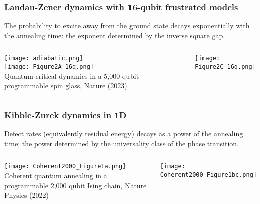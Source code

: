 \documentclass[aspectratio=169,final,11pt,forpublic]{beamer} %
\begin{document}
\begin{frame}\frametitle{\bf Landau-Zener dynamics with 16-qubit frustrated models}
  The probability to excite away from the ground state decays exponentially with the annealing time: the exponent determined by the inverse square gap. 
  \begin{columns}
    \begin{center}
    \texttt{[image: adiabatic.png]}\\
    \texttt{[image: Figure2A\_16q.png]}\\
    {\small Quantum critical dynamics in
      a 5,000-qubit programmable spin glass, Nature
      (2023)}
    \end{center}
    \texttt{[image: Figure2C\_16q.png]}
    \end{columns}
\end{frame}

\begin{frame}\frametitle{\bf Kibble-Zurek dynamics in 1D}
  Defect rates (equivalently residual energy) decays as a power of the annealing time; the power determined by the universality class of the phase transition.
  \begin{columns}
    \begin{center}
      \texttt{[image: Coherent2000\_Figure1a.png]}\\
      {\small Coherent quantum annealing in
      a programmable 2,000 qubit Ising chain, Nature
      Physics (2022)}
    \end{center}
    \begin{center}
      \texttt{[image: Coherent2000\_Figure1bc.png]}\\
    \end{center}
\end{columns}
\end{frame}

        
\end{document}
